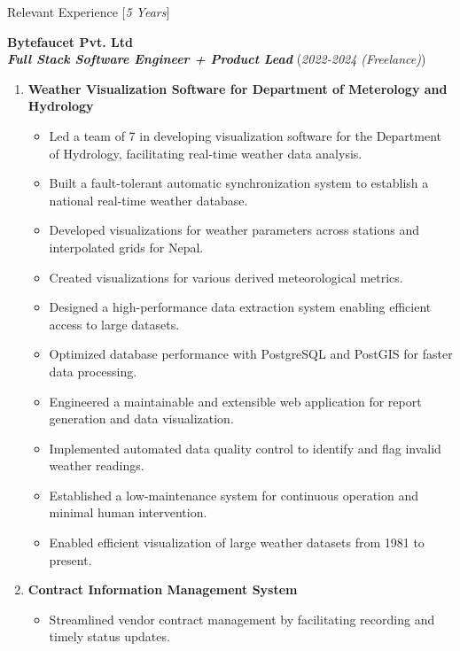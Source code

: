 \documentclass{resume} %
\begin{document}
\begin{rSection}{Relevant Experience [\textit{5 Years}]}
\begin{itemize}
    \end{itemize}

    \large{{\bf Bytefaucet Pvt. Ltd}}
    \\ \small{\textit{\textbf{Full Stack Software Engineer + Product Lead}}} (\small{\textit{2022-2024 (Freelance)}})

    \begin{enumerate}
        \item \textbf{Weather Visualization Software for Department of Meterology and Hydrology}
              \begin{itemize}
                  \item Led a team of 7 in developing visualization software for the Department of Hydrology, facilitating real-time weather data analysis.
                  \item Built a fault-tolerant automatic synchronization system to establish a national real-time weather database.
                  \item Developed visualizations for weather parameters across stations and interpolated grids for Nepal.
                  \item Created visualizations for various derived meteorological metrics.
                  \item Designed a high-performance data extraction system enabling efficient access to large datasets.
                  \item Optimized database performance with PostgreSQL and PostGIS for faster data processing.
                  \item Engineered a maintainable and extensible web application for report generation and data visualization.
                  \item Implemented automated data quality control to identify and flag invalid weather readings.
                  \item Established a low-maintenance system for continuous operation and minimal human intervention.
                  \item Enabled efficient visualization of large weather datasets from 1981 to present.
              \end{itemize}
        \item \textbf{Contract Information Management System}
              \begin{itemize}
                  \item Streamlined vendor contract management by facilitating recording and timely status updates.

\end{itemize}
\end{enumerate}
\end{rSection}
\end{document}
